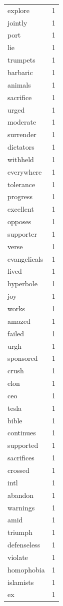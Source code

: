\begin{tabular}{lr}
explore & 1 \\
jointly & 1 \\
port & 1 \\
lie & 1 \\
trumpets & 1 \\
barbaric & 1 \\
animals & 1 \\
sacrifice & 1 \\
urged & 1 \\
moderate & 1 \\
surrender & 1 \\
dictators & 1 \\
withheld & 1 \\
everywhere & 1 \\
tolerance & 1 \\
progress & 1 \\
excellent & 1 \\
opposes & 1 \\
supporter & 1 \\
verse & 1 \\
evangelicals & 1 \\
lived & 1 \\
hyperbole & 1 \\
joy & 1 \\
works & 1 \\
amazed & 1 \\
failed & 1 \\
urgh & 1 \\
sponsored & 1 \\
crush & 1 \\
elon & 1 \\
ceo & 1 \\
tesla & 1 \\
bible & 1 \\
continues & 1 \\
supported & 1 \\
sacrifices & 1 \\
crossed & 1 \\
intl & 1 \\
abandon & 1 \\
warnings & 1 \\
amid & 1 \\
triumph & 1 \\
defenseless & 1 \\
violate & 1 \\
homophobia & 1 \\
islamists & 1 \\
ex & 1 \\

\end{tabular}
